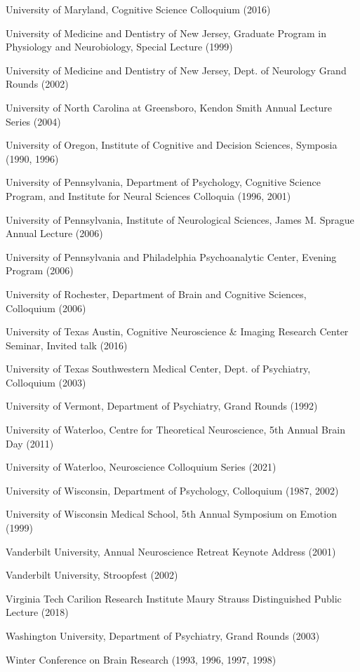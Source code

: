 \documentclass[10 pt]{article}
\begin{document}
University of Maryland, Cognitive Science Colloquium (2016)

University of Medicine and Dentistry of New Jersey, Graduate Program in Physiology and Neurobiology, Special Lecture (1999)

University of Medicine and Dentistry of New Jersey, Dept. of Neurology Grand Rounds (2002)

University of North Carolina at Greensboro, Kendon Smith Annual Lecture Series (2004)

University of Oregon, Institute of Cognitive and Decision Sciences, Symposia (1990, 1996)

University of Pennsylvania, Department of Psychology, Cognitive Science Program, and Institute for Neural Sciences Colloquia (1996, 2001)

University of Pennsylvania, Institute of Neurological Sciences, James M. Sprague Annual Lecture (2006)

University of Pennsylvania and Philadelphia Psychoanalytic Center, Evening Program (2006)

University of Rochester, Department of Brain and Cognitive Sciences, Colloquium (2006)

University of Texas Austin, Cognitive Neuroscience \& Imaging Research Center Seminar, Invited talk (2016)

University of Texas Southwestern Medical Center, Dept. of Psychiatry, Colloquium (2003)

University of Vermont, Department of Psychiatry, Grand Rounds (1992)

University of Waterloo, Centre for Theoretical Neuroscience, 5th Annual Brain Day (2011)

University of Waterloo, Neuroscience Colloquium Series (2021)

University of Wisconsin, Department of Psychology, Colloquium (1987, 2002)

University of Wisconsin Medical School, 5th Annual Symposium on Emotion (1999)

Vanderbilt University, Annual Neuroscience Retreat Keynote Address (2001)

Vanderbilt University, Stroopfest (2002)

Virginia Tech Carilion Research Institute Maury Strauss Distinguished Public Lecture (2018)

Washington University, Department of Psychiatry, Grand Rounds (2003)

Winter Conference on Brain Research (1993, 1996, 1997, 1998)
\end{document}
